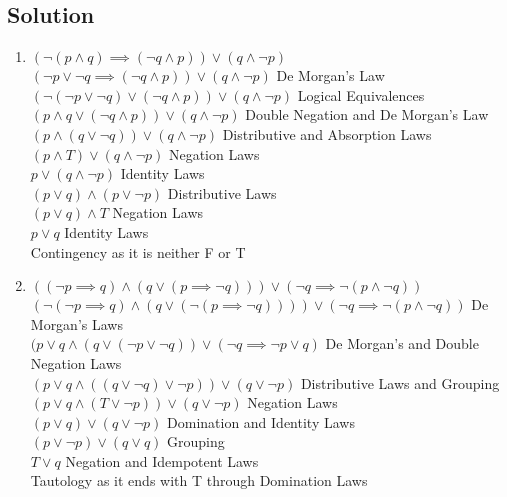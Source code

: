 \documentclass[11pt]{article}
\begin{document}
    \subsection*{Solution}
    \begin{enumerate}[label=(\alph*)]
        \item \((\neg(p\land q) \implies (\neg q \land p)) \lor (q \land \neg p)\) \\
        \((\neg p \lor \neg q \implies (\neg q \land p)) \lor (q \land \neg p)\) De Morgan's Law \\
        \((\neg (\neg p \lor \neg q) \lor (\neg q \land p)) \lor (q \land \neg p)\) Logical Equivalences \\
        \((p \land q \lor (\neg q \land p))  \lor (q \land \neg p)\) Double Negation and De Morgan's Law \\
        \((p \land (q \lor \neg q)) \lor (q \land \neg p)\) Distributive  and Absorption Laws \\
        \((p \land T) \lor (q \land \neg p)\) Negation Laws \\
        \(p \lor (q \land \neg p)\) Identity Laws \\
        \((p\lor q) \land (p \lor \neg p)\) Distributive Laws \\
        \((p \lor q) \land T\) Negation Laws \\
        \(p \lor q\) Identity Laws \\
        Contingency as it is neither F or T
        
        \item \(((\neg p \implies q) \land (q \lor (p \implies \neg q))) \lor (\neg q \implies \neg (p \land \neg q))\) \\
        \((\neg(\neg p \implies q) \land (q \lor (\neg(p \implies \neg q)))) \lor (\neg q \implies \neg (p \land \neg q))\) De Morgan's Laws \\
        \(( p \lor q \land (q \lor (\neg p \lor \neg q)) \lor (\neg q \implies \neg p \lor  q)\) De Morgan's and Double Negation Laws \\
        \((p \lor q \land ((q \lor \neg q) \lor \neg p)) \lor (q \lor \neg p)\) Distributive Laws and Grouping \\
        \((p \lor q \land (T \lor \neg p)) \lor (q \lor \neg p)\) Negation Laws \\
        \((p \lor q) \lor (q \lor \neg p)\) Domination and Identity Laws \\
        \((p \lor \neg p) \lor (q \lor q)\) Grouping \\
        \(T \lor q\) Negation and Idempotent Laws \\
        Tautology as it ends with T through Domination Laws
                
        
    \end{enumerate}
\end{document}
